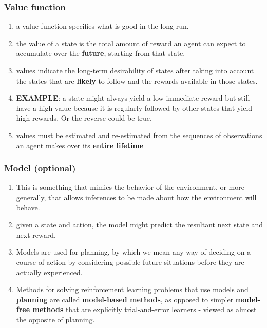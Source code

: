 \subsubsection{Value function \cite{drl-1}}\label{rl: Value function}

\begin{enumerate}
    \item  a value function specifies what is good in the long run.

    \item the value of a state is the total amount of reward an agent can expect to accumulate over the \textbf{future}, starting from that state.

    \item values indicate the long-term desirability of states after taking into account the states that are \textbf{likely} to follow and the rewards available in those states.

    \item \textbf{EXAMPLE}: a state might always yield a low immediate reward but still have a high value because it is regularly followed by other states that yield high rewards. Or the reverse could be true.

    \item values must be estimated and re-estimated from the sequences of observations an agent makes over its \textbf{entire lifetime}

    
\end{enumerate}

\subsubsection{Model (optional) \cite{drl-1}}\label{rl: model}
\begin{enumerate}
    \item This is something that mimics the behavior of the environment, or more generally, that allows inferences to be made about how the environment will behave.

    \item given a state and action, the model might predict the resultant next state and next reward. 
    
    \item Models are used for planning, by which we mean any way of deciding on a course of action by considering possible future situations before they are actually experienced. 
    
    \item Methods for solving reinforcement learning problems that use models and \textbf{planning} are called \textbf{model-based methods}, as opposed to simpler \textbf{model-free methods} that are explicitly trial-and-error learners - viewed as almost the opposite of planning.
\end{enumerate}




